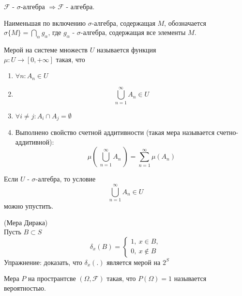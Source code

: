 \documentclass[a4paper, 12pt]{article}
\begin{document}
\begin{comm}
    $\mathcal{F}$ - $\sigma$-алгебра $\Rightarrow \mathcal{F}$ - алгебра.
\end{comm}
\begin{comm}
    Наименьшая по включению $\sigma$-алгебра, содержащая $M$, обозначается $\sigma\{M\}=\bigcap\limits_{\alpha}g_{\alpha}$, где $g_{\alpha}$ - $\sigma$-алгебра, содержащая все элементы $M$.
\end{comm}
\begin{definition}
    Мерой на системе множеств $U$ называется функция\\ 
    $\mu: U\to [0,+\infty]$ такая, что
    \begin{enumerate}
        \item $\forall n: A_n\in U$
        \item \[\bigcup\limits_{n=1}^{\infty}A_n\in U\]
        \item $\forall i\ne j: A_i\cap A_j=\emptyset$
        \item Выполнено свойство счетной аддитивности (такая мера называется счетно-аддитивной):
        \[\mu\left(\ \bigcup\limits_{n=1}^{\infty}A_n\ \right)=\sum_{n=1}^{\infty}\mu(A_n)\]
    \end{enumerate}
\end{definition}
\begin{comm}
    Если $U$ - $\sigma$-алгебра, то условие
    \[\bigcup\limits_{n=1}^{\infty}A_n\in U\]
    можно упустить.
\end{comm}
\begin{example} (Мера Дирака)\\
    Пусть $B\subset S$
    \[\delta_x(B)=\begin{cases}
        1,\ x\in B,\\
        0,\ x\not\in B
    \end{cases}\]
    Упражнение: доказать, что $\delta_x(.)$ является мерой на $2^S$
\end{example}
\begin{definition}
    Мера $P$ на пространтсве $(\Omega, \mathcal{F})$ такая, что $P(\Omega)=1$ называется вероятностью.
\end{definition}
\end{document}
